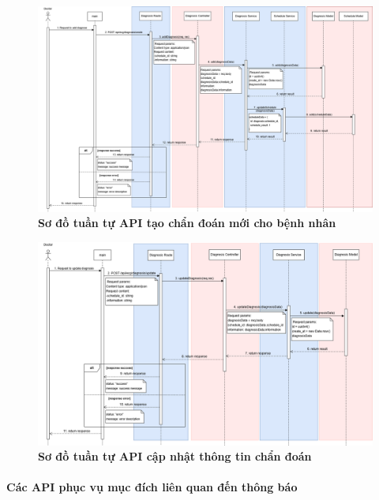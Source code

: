 \begin{figure}[H]
	\centering
	\includegraphics[width=16cm]{Images/api_sequence/diag/create.drawio.png}
	\caption[Sơ đồ tuần tự API tạo chẩn đoán mới cho bệnh nhân]{\bfseries \fontsize{12pt}{0pt}\selectfont Sơ đồ tuần tự API tạo chẩn đoán mới cho bệnh nhân}
	\label{sequence_diagram_create_diagnosis}
\end{figure}

\begin{figure}[H]
	\centering
	\includegraphics[width=16cm]{Images/api_sequence/diag/update.drawio.png}
	\caption[Sơ đồ tuần tự API cập nhật thông tin chẩn đoán]{\bfseries \fontsize{12pt}{0pt}\selectfont Sơ đồ tuần tự API cập nhật thông tin chẩn đoán}
	\label{sequence_diagram_update_diagnosis}
\end{figure}

\paragraph{Các API phục vụ mục đích liên quan đến thông báo}
\mbox{}

